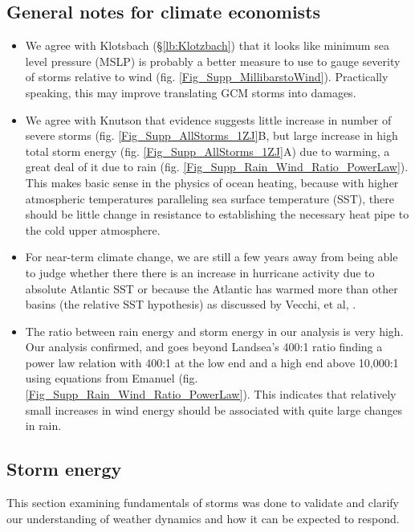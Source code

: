 \documentclass{article}
\begin{document}
\subsection{General notes for climate economists}
\begin{itemize}
    \item  We agree with Klotsbach (\S\ref{lb:Klotzbach}) that it looks like minimum sea level pressure (MSLP) is probably a better measure to use to gauge severity of storms relative to wind (fig. \ref{Fig_Supp_MillibarstoWind}). Practically speaking, this may improve translating GCM storms into damages.
    \item  We agree with Knutson \cite{Knutson2022WarmingAndHurricanes} that evidence suggests little increase in number of severe storms (fig. \ref{Fig_Supp_AllStorms_1ZJ}B, but large increase in high total storm energy (fig. \ref{Fig_Supp_AllStorms_1ZJ}A) due to warming, a great deal of it due to rain (fig. \ref{Fig_Supp_Rain_Wind_Ratio_PowerLaw}).  This makes basic sense in the physics of ocean heating, because with higher atmospheric temperatures paralleling sea surface temperature (SST), there should be little change in resistance to establishing the necessary heat pipe to the cold upper atmosphere. 
    \item  For near-term climate change, we are still a few years away from being able to judge whether there there is an increase in hurricane activity due to absolute Atlantic SST or because the Atlantic has warmed more than other basins (the relative SST hypothesis) as discussed by Vecchi, et al, \cite[p. 688, Fig 1]{Vecchi2008WhitherHurricaneActivity} \cite{Swanson2008NonlocalityAtlCycloneIntensity}.   
    \item  The ratio between rain energy and storm energy in our analysis is very high. Our analysis confirmed, and goes beyond Landsea's 400:1 ratio \cite{Landsea2018Energy400to1} finding a power law relation with 400:1 at the low end and a high end above 10,000:1 using equations from Emanuel \cite{Emanuel1986AnAirSeaInteractionTheoryforTropicalCyclonesPartISteadyStateMaintenance} (fig. \ref{Fig_Supp_Rain_Wind_Ratio_PowerLaw}). This indicates that relatively small increases in wind energy should be associated with quite large changes in rain.    
\end{itemize}
\subsection{Storm energy}
This section examining fundamentals of storms was done to validate and clarify our understanding of weather dynamics and how it can be expected to respond. 
\end{document}
